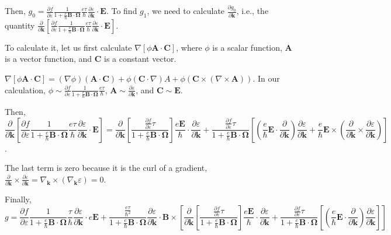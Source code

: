 \documentclass[aps,pra,amsmath,amssymb,floatfix,twocolumn, amsmath, superscriptaddress, twocolumn]{revtex4-2}
\newcommand{\bvec}[1]{{\mathbf #1}}
\begin{document}
Then, ${g_0} = \frac{\partial f} {\partial \varepsilon}\frac{1}{1 + \frac{e}{\hbar} \bvec{B}\cdot\bvec{\Omega}}
\frac{e \tau}{\hbar} \frac{\partial \varepsilon}{\partial \bvec{k}}\cdot \bvec{E}$. To find $g_1$, we need to calculate $\frac{\partial g_0}{\partial \bvec{k}}$, i.e., the quantity 
$\frac{\partial}{\partial \bvec{k}} \left[ \frac{\partial f} {\partial \varepsilon}\frac{1}{1 + \frac{e}{\hbar} \bvec{B}\cdot\bvec{\Omega}}
\frac{e \tau}{\hbar} \frac{\partial \varepsilon}{\partial \bvec{k}}\cdot \bvec{E} \right]$.

To calculate it, let us first calculate $\nabla \left[\phi \bvec{A}\cdot\bvec{C}\right]$, where $\phi$ is a scalar function, $\bvec{A}$ is a vector function, and $\bvec{C}$ is a constant vector.

$\nabla \left[\phi \bvec{A}\cdot\bvec{C}\right] = (\nabla \phi) (\bvec{A}\cdot\bvec{C}) + \phi (\bvec{C}\cdot \nabla){A} + \phi (\bvec{C}\times(\nabla\times\bvec{A})) $. In our calculation, $\phi \sim \frac{\partial f} {\partial \varepsilon}\frac{1}{1 + \frac{e}{\hbar} \bvec{B}\cdot\bvec{\Omega}}
\frac{e \tau}{\hbar}$, $\bvec{A} \sim \frac{\partial \varepsilon}{\partial \bvec{k}}$, and $\bvec{C} \sim \bvec{E}$.

Then, $$\frac{\partial}{\partial \bvec{k}} \left[ \frac{\partial f} {\partial \varepsilon}\frac{1}{1 + \frac{e}{\hbar} \bvec{B}\cdot\bvec{\Omega}}
\frac{e \tau}{\hbar} \frac{\partial \varepsilon}{\partial \bvec{k}}\cdot \bvec{E} \right] = \frac{\partial}{\partial \bvec{k}} \left[ \frac{\frac{\partial f} {\partial \varepsilon} \tau}{1 + \frac{e}{\hbar} \bvec{B}\cdot\bvec{\Omega}}
 \right] \frac{e \bvec{E}}{\hbar} \cdot \frac{\partial \varepsilon}{\partial \bvec{k}} + \frac{\frac{\partial f} {\partial \varepsilon} \tau}{1 + \frac{e}{\hbar} \bvec{B}\cdot\bvec{\Omega}} \left[(\frac{e}{\hbar} \bvec{E}\cdot \frac{\partial }{\partial \bvec{k}} )\frac{\partial \varepsilon}{\partial \bvec{k}} + \frac{e}{\hbar} \bvec{E}\times (\frac{\partial }{\partial \bvec{k}} \times \frac{\partial \varepsilon}{\partial \bvec{k}}) \right]$$.
 
 The last term is zero because it is the curl of a gradient, $\frac{\partial }{\partial \bvec{k}} \times \frac{\partial \varepsilon}{\partial \bvec{k}} = \nabla_\bvec{k} \times (\nabla_\bvec{k} \varepsilon) = 0$.
 
 Finally,
\begin{equation}
 g = \frac{\partial f} {\partial \varepsilon}\frac{1}{1 + \frac{e}{\hbar} \bvec{B}\cdot\bvec{\Omega}}
 \frac{\tau}{\hbar} \frac{\partial \varepsilon}{\partial \bvec{k}}\cdot e \bvec{E} + \frac{\frac{e \tau}{\hbar^2} }{1 + \frac{e}{\hbar} \bvec{B}\cdot\bvec{\Omega}} \frac{\partial \varepsilon}{\partial \bvec{k}} \cdot \bvec{B} \times \left[ \frac{\partial}{\partial \bvec{k}} \left[ \frac{\frac{\partial f} {\partial \varepsilon} \tau}{1 + \frac{e}{\hbar} \bvec{B}\cdot\bvec{\Omega}}
 \right] \frac{e \bvec{E}}{\hbar} \cdot \frac{\partial \varepsilon}{\partial \bvec{k}} + \frac{\frac{\partial f} {\partial \varepsilon} \tau}{1 + \frac{e}{\hbar} \bvec{B}\cdot\bvec{\Omega}} \left[(\frac{e}{\hbar} \bvec{E}\cdot \frac{\partial }{\partial \bvec{k}} )\frac{\partial \varepsilon}{\partial \bvec{k}} \right] \right]
 \end{equation}\label{Eq:g_non_zero_E}
 
\end{document}
